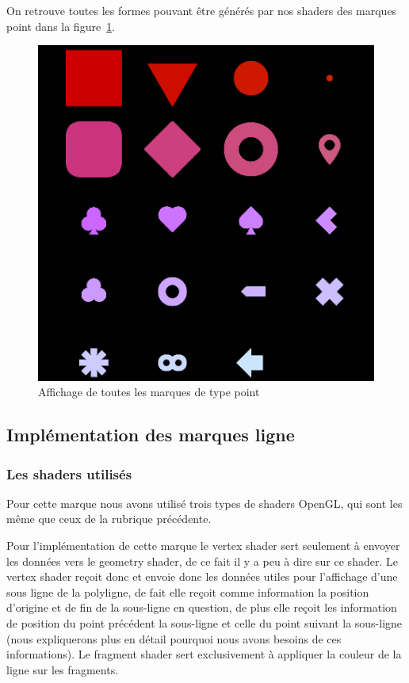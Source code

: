 \documentclass[12pt]{article}
\begin{document}
On retrouve toutes les formes pouvant être générés par nos shaders des marques point dans la figure~\ref{fig:point-marks}.
\begin{figure}[htp]
  \centering
  \includegraphics[scale=0.5]{images/point_mark}
  \caption{Affichage de toutes les marques de type point}
  \label{fig:point-marks}
\end{figure}

\subsection{Implémentation des marques ligne}
\subsubsection{Les shaders utilisés}
Pour cette marque nous avons utilisé trois types de shaders OpenGL, qui sont les même que ceux de la rubrique précédente.

Pour l’implémentation de cette marque le vertex shader sert seulement à envoyer
 les données vers le geometry shader, de ce fait il y a peu à dire sur ce shader.
 Le vertex shader reçoit donc et envoie donc les données utiles pour l’affichage
 d’une sous ligne de la polyligne, de fait elle reçoit comme information la position
 d’origine et de fin de la sous-ligne en question, de plus elle reçoit les information
 de position du point précédent la sous-ligne et celle du point suivant la sous-ligne
 (nous expliquerons plus en détail pourquoi nous avons besoins de ces informations).
 Le fragment shader sert exclusivement à appliquer la couleur de la ligne sur les fragments.
\end{document}
